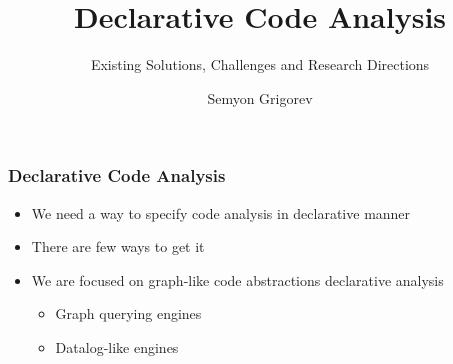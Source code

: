 \documentclass[xcolor=table,aspectratio=169]{beamer}
\title[Declarative Code Analysis]{Declarative Code Analysis}
\subtitle{Existing Solutions, Challenges and Research Directions}
\author[Semyon Grigorev]{Semyon Grigorev}
\begin{document}
{
\begin{frame}[fragile]
  \titlepage
\end{frame}
}

\begin{frame}[fragile]
  \frametitle{Declarative Code Analysis}
  \begin{itemize}
    \item We need a way to specify code analysis in declarative manner
    \pause
    \item There are few ways to get it
    \pause 
    \item We are focused on graph-like code abstractions declarative analysis
    \begin{itemize}
      \item Graph querying engines
      \item Datalog-like engines 
    \end{itemize}
  \end{itemize}  
\end{frame}
\end{document}
